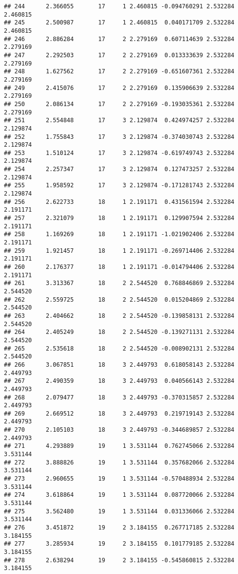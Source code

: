 \documentclass[]{book}
\theoremstyle{definition}
\theoremstyle{definition}
\theoremstyle{definition}
\theoremstyle{remark}
\begin{document}
\begin{verbatim}
## 244      2.366055       17     1 2.460815 -0.094760291 2.532284 2.460815
## 245      2.500987       17     1 2.460815  0.040171709 2.532284 2.460815
## 246      2.886284       17     2 2.279169  0.607114639 2.532284 2.279169
## 247      2.292503       17     2 2.279169  0.013333639 2.532284 2.279169
## 248      1.627562       17     2 2.279169 -0.651607361 2.532284 2.279169
## 249      2.415076       17     2 2.279169  0.135906639 2.532284 2.279169
## 250      2.086134       17     2 2.279169 -0.193035361 2.532284 2.279169
## 251      2.554848       17     3 2.129874  0.424974257 2.532284 2.129874
## 252      1.755843       17     3 2.129874 -0.374030743 2.532284 2.129874
## 253      1.510124       17     3 2.129874 -0.619749743 2.532284 2.129874
## 254      2.257347       17     3 2.129874  0.127473257 2.532284 2.129874
## 255      1.958592       17     3 2.129874 -0.171281743 2.532284 2.129874
## 256      2.622733       18     1 2.191171  0.431561594 2.532284 2.191171
## 257      2.321079       18     1 2.191171  0.129907594 2.532284 2.191171
## 258      1.169269       18     1 2.191171 -1.021902406 2.532284 2.191171
## 259      1.921457       18     1 2.191171 -0.269714406 2.532284 2.191171
## 260      2.176377       18     1 2.191171 -0.014794406 2.532284 2.191171
## 261      3.313367       18     2 2.544520  0.768846869 2.532284 2.544520
## 262      2.559725       18     2 2.544520  0.015204869 2.532284 2.544520
## 263      2.404662       18     2 2.544520 -0.139858131 2.532284 2.544520
## 264      2.405249       18     2 2.544520 -0.139271131 2.532284 2.544520
## 265      2.535618       18     2 2.544520 -0.008902131 2.532284 2.544520
## 266      3.067851       18     3 2.449793  0.618058143 2.532284 2.449793
## 267      2.490359       18     3 2.449793  0.040566143 2.532284 2.449793
## 268      2.079477       18     3 2.449793 -0.370315857 2.532284 2.449793
## 269      2.669512       18     3 2.449793  0.219719143 2.532284 2.449793
## 270      2.105103       18     3 2.449793 -0.344689857 2.532284 2.449793
## 271      4.293889       19     1 3.531144  0.762745066 2.532284 3.531144
## 272      3.888826       19     1 3.531144  0.357682066 2.532284 3.531144
## 273      2.960655       19     1 3.531144 -0.570488934 2.532284 3.531144
## 274      3.618864       19     1 3.531144  0.087720066 2.532284 3.531144
## 275      3.562480       19     1 3.531144  0.031336066 2.532284 3.531144
## 276      3.451872       19     2 3.184155  0.267717185 2.532284 3.184155
## 277      3.285934       19     2 3.184155  0.101779185 2.532284 3.184155
## 278      2.638294       19     2 3.184155 -0.545860815 2.532284 3.184155

\end{verbatim}
\end{document}
